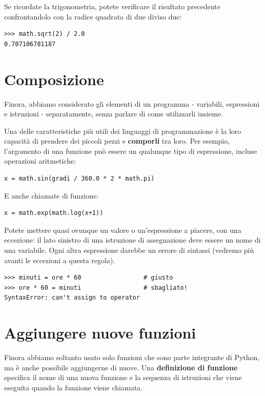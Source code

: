 \documentclass[10pt]{book}
\begin{document}
Se ricordate la trigonometria, potete verificare il risultato precedente confrontandolo con la radice quadrata di due diviso due:

\begin{verbatim}
>>> math.sqrt(2) / 2.0
0.707106781187
\end{verbatim}
%

\section{Composizione}

Finora, abbiamo considerato gli elementi di un programma - variabili, espressioni e istruzioni - separatamente, senza parlare di come utilizzarli insieme.

Una delle caratteristiche più utili dei linguaggi di programmazione è la loro capacità di prendere dei piccoli pezzi e {\bf comporli} tra loro. Per esempio, l'argomento di una funzione può essere un qualunque tipo di espressione, incluse operazioni aritmetiche:

\begin{verbatim}
x = math.sin(gradi / 360.0 * 2 * math.pi)
\end{verbatim}
%
E anche chiamate di funzione:

\begin{verbatim}
x = math.exp(math.log(x+1))
\end{verbatim}
%
Potete mettere quasi ovunque un valore o un'espressione a piacere, con una eccezione: il lato sinistro di una istruzione di assegnazione deve essere un nome di una variabile. Ogni altra espressione darebbe un errore di sintassi (vedremo più avanti le eccezioni a questa regola).

\begin{verbatim}
>>> minuti = ore * 60                 # giusto
>>> ore * 60 = minuti                 # sbagliato!
SyntaxError: can't assign to operator
\end{verbatim}
%


\section{Aggiungere nuove funzioni}

Finora abbiamo soltanto usato solo funzioni che sono parte integrante di Python, ma è anche possibile aggiungerne di nuove.
Una {\bf definizione di funzione} specifica il nome di una nuova funzione e la sequenza di istruzioni che viene eseguita quando la funzione viene chiamata.
\end{document}
